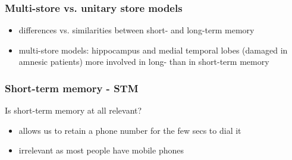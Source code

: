 \documentclass[]{beamer}
\begin{document}
\begin{frame}
 \frametitle{Multi-store vs. unitary store models}
\begin{overlayarea}{120mm}{90mm}
\begin{itemize}
 \item differences vs. similarities between short- and long-term memory
 \item multi-store models: hippocampus and medial temporal lobes (damaged in amnesic patients) more involved in long- than in short-term memory
\end{itemize}

\end{overlayarea}
\end{frame}


\begin{frame}
 \frametitle{Short-term memory - STM}
\begin{center}
 Is short-term memory at all relevant?
\end{center}
\begin{itemize}
 \item<2-> allows us to retain a phone number for the few secs to dial it
 \item<3-> irrelevant as most people have mobile phones
\end{itemize}
\end{frame}
\end{document}

